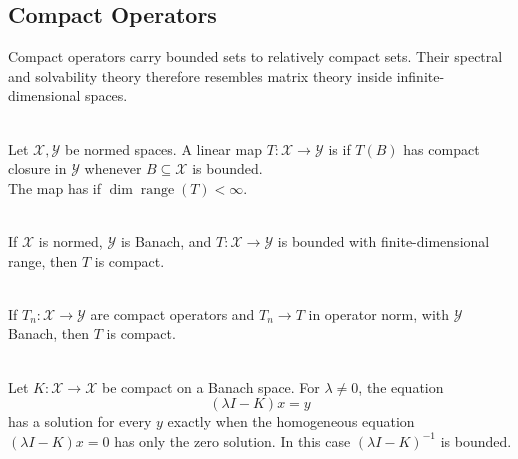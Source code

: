 \subsection{Compact Operators}

%

Compact operators carry bounded sets to relatively compact sets. Their spectral and solvability theory therefore resembles matrix theory inside infinite-dimensional spaces.

\begin{definition} \label{def:compact-and-finite-rank-operators} \\
Let $\mathcal{X},\mathcal{Y}$ be normed spaces. A linear map $T:\mathcal{X}\to\mathcal{Y}$ is  if $T(B)$ has compact closure in $\mathcal{Y}$ whenever $B\subseteq\mathcal{X}$ is bounded.\\
The map has  if $\dim\operatorname{range}(T)<\infty$.
\end{definition}

\begin{proposition} \label{prop:finite-rank-operators-compact} \\
If $\mathcal{X}$ is normed, $\mathcal{Y}$ is Banach, and $T:\mathcal{X}\to\mathcal{Y}$ is bounded with finite-dimensional range, then $T$ is compact.
\end{proposition}

\begin{theorem} \label{thm:compact-operator-closed-under-norm-limits} \\
If $T_n:\mathcal{X}\to\mathcal{Y}$ are compact operators and $T_n\to T$ in operator norm, with $\mathcal{Y}$ Banach, then $T$ is compact.
\end{theorem}

\begin{theorem} \label{thm:fredholm-alternative-compact-operator} \\
Let $K:\mathcal{X}\to\mathcal{X}$ be compact on a Banach space. For $\lambda\neq0$, the equation
\[
(\lambda I-K)x=y
\]
has a solution for every $y$ exactly when the homogeneous equation $(\lambda I-K)x=0$ has only the zero solution. In this case $(\lambda I-K)^{-1}$ is bounded.
\end{theorem}
